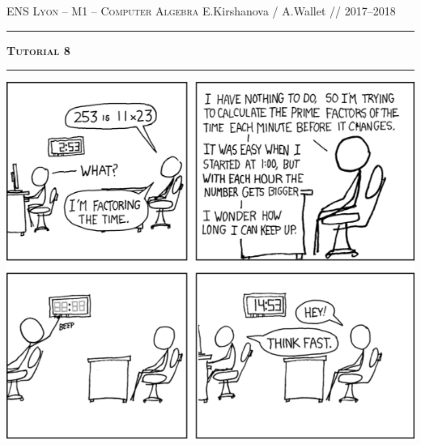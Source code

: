 \documentclass[11pt]{exam}
\theoremstyle{definition}
\begin{document}
{\noindent
   \textsc{ENS Lyon --  M1 -- Computer Algebra}
   \hfill {E.Kirshanova / A.Wallet // 2017--2018\\
  }
  \hrule
  \begin{center}
    {\Large\textbf{
   \textsc{Tutorial 8}
    } } 
  \end{center}
  \hrule \vspace{5mm}

\thispagestyle{empty}

\vspace{0.2cm}
\begin{center}
	\includegraphics[scale=6]{factoring_the_time}
\end{center}


	
			
}
\end{document}

